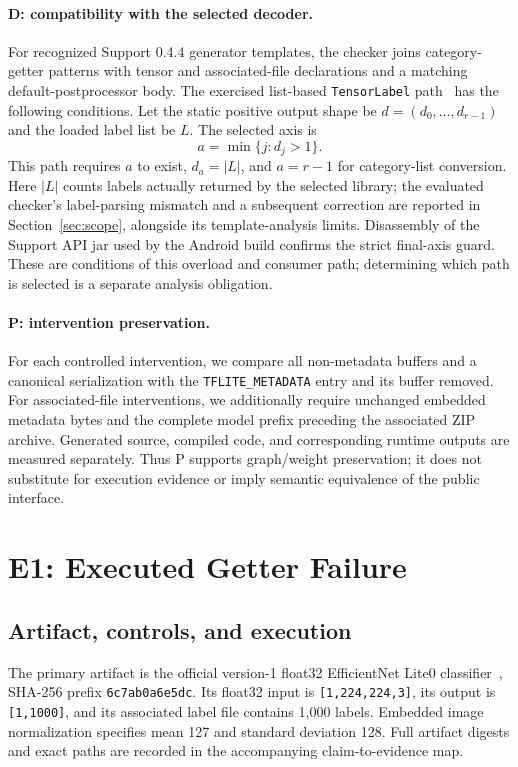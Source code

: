 \documentclass[10pt,twocolumn,letterpaper]{article}
\newcommand{\code}[1]{\texttt{#1}}
\begin{document}
\paragraph{D: compatibility with the selected decoder.}
For recognized Support 0.4.4 generator templates, the checker joins category-getter patterns with tensor and associated-file declarations and a matching default-postprocessor body. The exercised list-based \code{TensorLabel} path~\cite{tensorlabel} has the following conditions. Let the static positive output shape be $d=(d_0,\ldots,d_{r-1})$ and the loaded label list be $L$. The selected axis is
\begin{equation}
a=\min\{j:d_j>1\}.
\end{equation}
This path requires $a$ to exist, $d_a=|L|$, and $a=r-1$ for category-list conversion. Here $|L|$ counts labels actually returned by the selected library; the evaluated checker's label-parsing mismatch and a subsequent correction are reported in Section~\ref{sec:scope}, alongside its template-analysis limits. Disassembly of the Support API jar used by the Android build confirms the strict final-axis guard. These are conditions of this overload and consumer path; determining which path is selected is a separate analysis obligation.

\paragraph{P: intervention preservation.}
For each controlled intervention, we compare all non-metadata buffers and a canonical serialization with the \code{TFLITE\_METADATA} entry and its buffer removed. For associated-file interventions, we additionally require unchanged embedded metadata bytes and the complete model prefix preceding the associated ZIP archive. Generated source, compiled code, and corresponding runtime outputs are measured separately. Thus P supports graph/weight preservation; it does not substitute for execution evidence or imply semantic equivalence of the public interface.

\section{E1: Executed Getter Failure}
\label{sec:e1}
\subsection{Artifact, controls, and execution}
The primary artifact is the official version-1 float32 EfficientNet Lite0 classifier~\cite{efficientnet}, SHA-256 prefix \code{6c7ab0a6e5dc}. Its float32 input is \code{[1,224,224,3]}, its output is \code{[1,1000]}, and its associated label file contains 1,000 labels. Embedded image normalization specifies mean 127 and standard deviation 128. Full artifact digests and exact paths are recorded in the accompanying claim-to-evidence map.
\end{document}
